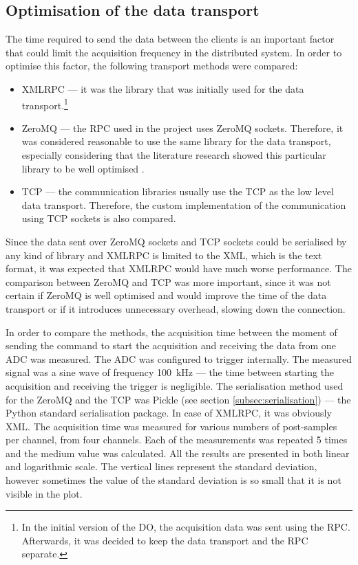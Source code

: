     \subsection{Optimisation of the data transport} \label{section:data_transport_opt}
        The time required to send the data between the clients is an important factor that could limit the acquisition frequency in the distributed system. In order to optimise this factor, the following transport methods were compared:
        \begin{itemize}
            \item XMLRPC --- it was the library that was initially used for the data transport.\footnote{In the initial version of the DO, the acquisition data was sent using the RPC. Afterwards, it was decided to keep the data transport and the RPC separate.}
            \item ZeroMQ --- the RPC used in the project uses ZeroMQ sockets. Therefore, it was considered reasonable to use the same library for the data transport, especially considering that the literature research showed this particular library to be well optimised \cite{zmq_comparison}.
            \item TCP --- the communication libraries usually use the TCP as the low level data transport. Therefore, the custom implementation of the communication using TCP sockets is also compared.
        \end{itemize}
        
        Since the data sent over ZeroMQ sockets and TCP sockets could be serialised by any kind of library and XMLRPC is limited to the XML, which is the text format, it was expected that XMLRPC would have much worse performance. The comparison between ZeroMQ and TCP was more important, since it was not certain if ZeroMQ is well optimised and would improve the time of the data transport or if it introduces unnecessary overhead, slowing down the connection.
        
        In order to compare the methods, the acquisition time between the moment of sending the command to start the acquisition and receiving the data from one ADC was measured. The ADC was configured to trigger internally. The measured signal was a sine wave of frequency 100~kHz --- the time between starting the acquisition and receiving the trigger is negligible. The serialisation method used for the ZeroMQ and the TCP was Pickle (see section \ref{subsec:serialisation}) --- the Python standard serialisation package. In case of XMLRPC, it was obviously XML. The acquisition time was measured for various numbers of post-samples per channel, from four channels. Each of the measurements was repeated 5 times and the medium value was calculated. All the results are presented in both linear and logarithmic scale. The vertical lines represent the standard deviation, however sometimes the value of the standard deviation is so small that it is not visible in the plot.
        
